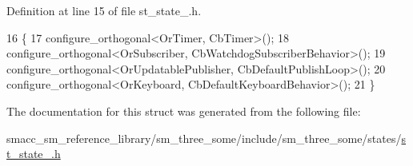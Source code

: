 Definition at line 15 of file st\+\_\+state\+\_.\+h.


\begin{DoxyCode}
16     \{
17         configure\_orthogonal<OrTimer, CbTimer>();
18         configure\_orthogonal<OrSubscriber, CbWatchdogSubscriberBehavior>();
19         configure\_orthogonal<OrUpdatablePublisher, CbDefaultPublishLoop>();
20         configure\_orthogonal<OrKeyboard, CbDefaultKeyboardBehavior>();
21     \}
\end{DoxyCode}


The documentation for this struct was generated from the following file\+:\begin{DoxyCompactItemize}
\item 
smacc\+\_\+sm\+\_\+reference\+\_\+library/sm\+\_\+three\+\_\+some/include/sm\+\_\+three\+\_\+some/states/\hyperlink{st__state__3_8h}{st\+\_\+state\+\_.\+h}\end{DoxyCompactItemize}
